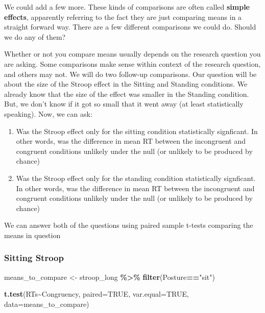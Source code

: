 \documentclass[
]{book}
\newenvironment{Shaded}{\begin{snugshade}}{\end{snugshade}}
\newcommand{\AttributeTok}[1]{\textcolor[rgb]{0.13,0.29,0.53}{#1}}
\newcommand{\ConstantTok}[1]{\textcolor[rgb]{0.56,0.35,0.01}{#1}}
\newcommand{\FunctionTok}[1]{\textcolor[rgb]{0.13,0.29,0.53}{\textbf{#1}}}
\newcommand{\NormalTok}[1]{#1}
\newcommand{\OtherTok}[1]{\textcolor[rgb]{0.56,0.35,0.01}{#1}}
\newcommand{\SpecialCharTok}[1]{\textcolor[rgb]{0.81,0.36,0.00}{\textbf{#1}}}
\newcommand{\StringTok}[1]{\textcolor[rgb]{0.31,0.60,0.02}{#1}}
\begin{document}
We could add a few more. These kinds of comparisons are often called
\textbf{simple effects}, apparently referring to the fact they are just
comparing means in a straight forward way. There are a few different
comparisons we could do. Should we do any of them?

Whether or not you compare means usually depends on the research
question you are asking. Some comparisons make sense within context of
the research question, and others may not. We will do two follow-up
comparisons. Our question will be about the size of the Stroop effect in
the Sitting and Standing conditions. We already know that the size of
the effect was smaller in the Standing condition. But, we don't know if
it got so small that it went away (at least statistically speaking).
Now, we can ask:

\begin{enumerate}
\def\labelenumi{\arabic{enumi}.}
\item
  Was the Stroop effect only for the sitting condition statistically
  signficant. In other words, was the difference in mean RT between
  the incongruent and congruent conditions unlikely under the null (or
  unlikely to be produced by chance)
\item
  Was the Stroop effect only for the standing condition statistically
  signficant. In other words, was the difference in mean RT between
  the incongruent and congruent conditions unlikely under the null (or
  unlikely to be produced by chance)
\end{enumerate}

We can answer both of the questions using paired sample t-tests
comparing the means in question

\hypertarget{sitting-stroop}{%
\subsubsection{Sitting Stroop}\label{sitting-stroop}}

\begin{Shaded}
\begin{Highlighting}[]
\NormalTok{means\_to\_compare }\OtherTok{\textless{}{-}}\NormalTok{ stroop\_long }\SpecialCharTok{\%\textgreater{}\%}
                      \FunctionTok{filter}\NormalTok{(Posture}\SpecialCharTok{==}\StringTok{"sit"}\NormalTok{)}

\FunctionTok{t.test}\NormalTok{(RTs}\SpecialCharTok{\textasciitilde{}}\NormalTok{Congruency, }\AttributeTok{paired=}\ConstantTok{TRUE}\NormalTok{, }\AttributeTok{var.equal=}\ConstantTok{TRUE}\NormalTok{, }\AttributeTok{data=}\NormalTok{means\_to\_compare)}
\end{Highlighting}
\end{Shaded}
\end{document}
